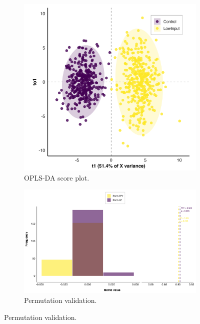 \documentclass[10pt,letterpaper]{article}
\begin{document}
\begin{figure}[htbp]
  \centering

  \begin{subfigure}[b]{0.28\textwidth}
    \includegraphics[width=\textwidth]{fig/main/Fig2a_OPLS_scores_plot.png}
    \caption{OPLS-DA score plot.} 
    \label{fig:opls_scores}
  \end{subfigure}
  \begin{subfigure}[b]{0.52\textwidth}
    \includegraphics[width=\textwidth]{fig/main/Fig2b_OPLS_permutation_plot.png}
    \caption{Permutation validation. }
    \label{fig:opls_perm}
  \end{subfigure}


\end{figure}
\end{document}
